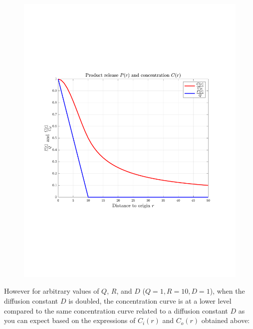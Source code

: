 \documentclass[12pt,twoside]{article}
\begin{document}
\begin{figure}[H]
 \centering
 \includegraphics[scale=0.4]{concentration}
\end{figure}

However for arbitrary values of $Q$, $R$, and $D$ ($Q=1, R=10, D=1$), when the  diffusion constant $D$ is doubled,  the concentration curve is at a lower level
compared to the same concentration curve related to a diffusion constant $D$ as you can expect based on the expressions of $C_i(r)$ and $C_o(r)$ obtained above:
\end{document}
